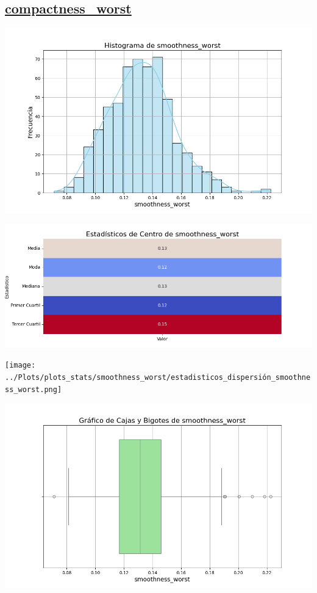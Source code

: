 \documentclass[a4paper, 12pt]{article}
\begin{document}
\subsection*{\underline{compactness\_worst}}

	\includegraphics[width=\textwidth]{../Plots/plots_stats/smoothness_worst/histograma_smoothness_worst.png}




\includegraphics[width=\textwidth]{../Plots/plots_stats/smoothness_worst/estadisticas_centro_smoothness_worst.png}




\texttt{[image: ../Plots/plots\_stats/smoothness\_worst/estadisticos\_dispersión\_smoothness\_worst.png]}



\includegraphics[width=\textwidth]{../Plots/plots_stats/smoothness_worst/boxplot_smoothness_worst.png}
\end{document}
